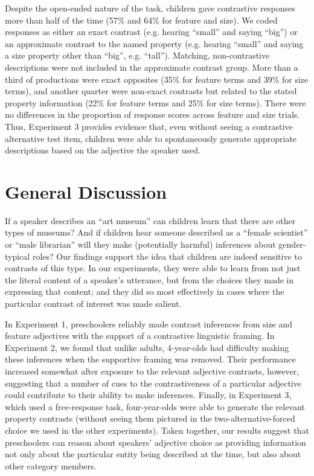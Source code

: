 \documentclass[man]{apa2}
\begin{document}
Despite the open-ended nature of the task, children gave contrastive responses more than half of the time (57\% and 64\% for feature and size).  We coded responses as either an exact contrast (e.g. hearing ``small'' and saying ``big'') or an approximate contrast to the named property (e.g. hearing ``small'' and saying a size property other than ``big'', e.g. ``tall''). Matching, non-contrastive descriptions were not included in the approximate contrast group. More than a third of productions were exact opposites (35\% for feature terms and 39\% for size terms), and another quarter were non-exact contrasts but related to the stated property information (22\% for feature terms and 25\% for size terms). There were no differences in the proportion of response scores across feature and size trials. Thus, Experiment 3 provides evidence that, even without seeing a contrastive alternative test item, children were able to spontaneously generate appropriate descriptions based on the adjective the speaker used.  

\section{General Discussion}

If a speaker describes an ``art museum'' can children learn that there are other types of museums? And if children hear someone described as a ``female scientist'' or ``male librarian'' will they make (potentially harmful) inferences about gender-typical roles? Our findings support the idea that children are indeed sensitive to contrasts of this type. In our experiments, they were able to learn from not just the literal content of a speaker's utterance, but from the choices they made in expressing that content; and they did so most effectively in cases where the particular contrast of interest was made salient.

In Experiment 1, preschoolers reliably made contrast inferences from size and feature adjectives with the support of a contrastive linguistic framing.  In Experiment 2, we found that unlike adults, 4-year-olds had difficulty making these inferences when the supportive framing was removed. Their performance increased somewhat after exposure to the relevant adjective contrasts, however, suggesting that a number of cues to the contrastiveness of a particular adjective could contribute to their ability to make inferences. Finally, in Experiment 3, which used a free-response task, four-year-olds were able to generate the relevant property contrasts (without seeing them pictured in the two-alternative-forced choice we used in the other experiments). Taken together, our results suggest that preschoolers can reason about speakers' adjective choice as providing information not only about the particular entity being described at the time, but also about other category members. 
\end{document}
